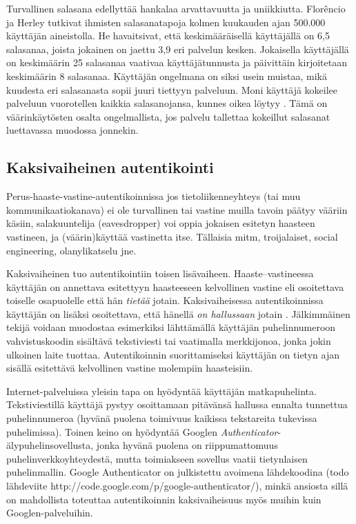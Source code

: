 \documentclass[finnish,gradu]{tktltiki}
\begin{document}
  Turvallinen salasana edellyttää hankalaa arvattavuutta ja uniikkiutta. Florêncio ja Herley \cite{study_of_passwords_07} tutkivat ihmisten salasanatapoja kolmen kuukauden ajan 500.000 käyttäjän aineistolla. He havaitsivat, että keskimääräisellä käyttäjällä on 6,5 salasanaa, joista jokainen on jaettu 3,9 eri palvelun kesken. Jokaisella käyttäjällä on keskimäärin 25 salasanaa vaativaa käyttäjätunnusta ja päivittäin kirjoitetaan keskimäärin 8 salasanaa. Käyttäjän ongelmana on siksi usein muistaa, mikä kuudesta eri salasanasta sopii juuri tiettyyn palveluun. Moni käyttäjä kokeilee palveluun vuorotellen kaikkia salasanojansa, kunnes oikea löytyy \cite{study_of_passwords_07}. Tämä on väärinkäytösten osalta ongelmallista, jos palvelu tallettaa kokeillut salasanat luettavassa muodossa jonnekin.


  \subsection{Kaksivaiheinen autentikointi} %
  \label{sub:kaksivaiheinen_autentikointi}

  Perus-haaste-vastine-autentikoinnissa jos tietoliikenneyhteys (tai muu kommunikaatiokanava) ei ole turvallinen tai vastine muilla tavoin päätyy vääriin käsiin, salakuuntelija (eavesdropper) voi oppia jokaisen esitetyn haasteen vastineen, ja (väärin)käyttää vastinetta itse.
  Tällaisia mitm, troijalaiset, social engineering, olanylikatselu jne.

  Kaksivaiheinen tuo autentikointiin toisen lisävaiheen. Haaste--vastineessa käyttäjän on annettava esitettyyn haasteeseen kelvollinen vastine eli osoitettava toiselle osapuolelle että hän \emph{tietää} jotain. Kaksivaiheisessa autentikoinnissa käyttäjän on lisäksi osoitettava, että hänellä \emph{on hallussaan} jotain \cite{NIST_SP800-63, google_2step_2010}. Jälkimmäinen tekijä voidaan muodostaa esimerkiksi lähttämällä käyttäjän puhelinnumeroon vahvistuskoodin sisältävä tekstiviesti tai vaatimalla merkkijonoa, jonka jokin ulkoinen laite tuottaa. Autentikoinnin suorittamiseksi käyttäjän on tietyn ajan sisällä esitettävä kelvollinen vastine molempiin haasteisiin.

  Internet-palveluissa yleisin tapa on hyödyntää käyttäjän matkapuhelinta. Tekstiviestillä käyttäjä pystyy osoittamaan pitävänsä hallussa ennalta tunnettua puhelinnumeroa (hyvänä puolena toimivuus kaikissa tekstareita tukevissa puhelimissa). Toinen keino on hyödyntää Googlen \emph{Authenticator}-älypuhelinsovellusta, jonka hyvänä puolena on riippumattomuus puhelinverkkoyhteydestä, mutta toimiakseen sovellus vaatii tietynlaisen puhelinmallin. Google Authenticator on julkistettu avoimena lähdekoodina (todo lähdeviite http://code.google.com/p/google-authenticator/), minkä ansiosta sillä on mahdollista toteuttaa autentikoinnin kaksivaiheisuus myös muihin kuin Googlen-palveluihin.
\end{document}
